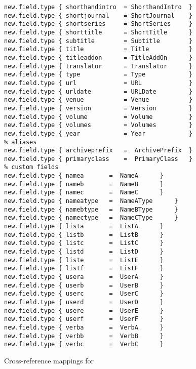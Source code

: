 \documentclass[11pt,a4paper]{scrbook}
\begin{document}
\begin{lstlisting}[language=BibTool]
new.field.type { shorthandintro  = ShorthandIntro  }
new.field.type { shortjournal    = ShortJournal    }
new.field.type { shortseries     = ShortSeries     }
new.field.type { shorttitle      = ShortTitle      }
new.field.type { subtitle        = Subtitle        }
new.field.type { title           = Title           }
new.field.type { titleaddon      = TitleAddOn      }
new.field.type { translator      = Translator      }
new.field.type { type            = Type            }
new.field.type { url             = URL             }
new.field.type { urldate         = URLDate         }
new.field.type { venue           = Venue           }
new.field.type { version         = Version         }
new.field.type { volume          = Volume          }
new.field.type { volumes         = Volumes         }
new.field.type { year            = Year            }
% aliases
new.field.type { archiveprefix	 =  ArchivePrefix  }
new.field.type { primaryclass	 =  PrimaryClass   }
% custom fields
new.field.type { namea		 =  NameA	   }
new.field.type { nameb		 =  NameB	   }
new.field.type { namec		 =  NameC	   }
new.field.type { nameatype	 =  NameAType	   }
new.field.type { namebtype	 =  NameBType	   }
new.field.type { namectype	 =  NameCType	   }
new.field.type { lista		 =  ListA	   }
new.field.type { listb		 =  ListB	   }
new.field.type { listc		 =  ListC	   }
new.field.type { listd		 =  ListD	   }
new.field.type { liste		 =  ListE	   }
new.field.type { listf		 =  ListF	   }
new.field.type { usera		 =  UserA	   }
new.field.type { userb		 =  UserB	   }
new.field.type { userc		 =  UserC	   }
new.field.type { userd		 =  UserD	   }
new.field.type { usere		 =  UserE	   }
new.field.type { userf		 =  UserF	   }
new.field.type { verba		 =  VerbA	   }
new.field.type { verbb		 =  VerbB	   }
new.field.type { verbc		 =  VerbC	   }
\end{lstlisting}

Cross-reference mappings for \bibLaTeX{}
\end{document}
